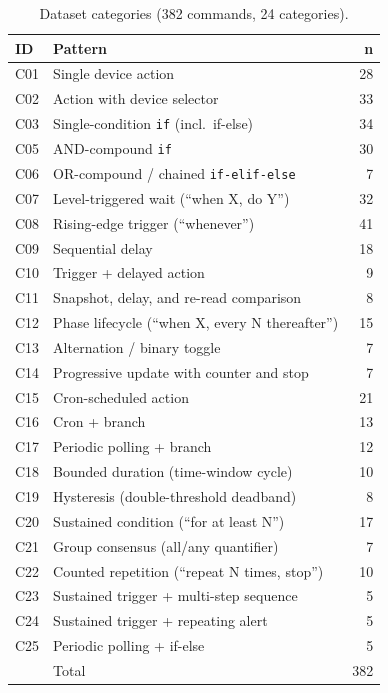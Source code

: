 \documentclass[sigconf,nonacm,anonymous,review]{acmart}
\begin{document}
\begin{table}[h]
\centering
\caption{Dataset categories (382 commands, 24 categories).}
\label{tab:categories}
\small
\setlength{\tabcolsep}{4pt}
\begin{tabular}{llr}
\toprule
ID & Pattern & n \\
\midrule
C01 & Single device action & 28 \\
C02 & Action with device selector & 33 \\
C03 & Single-condition \texttt{if} (incl.\ if-else) & 34 \\
C05 & AND-compound \texttt{if} & 30 \\
C06 & OR-compound / chained \texttt{if-elif-else} & 7 \\
C07 & Level-triggered wait (``when X, do Y'') & 32 \\
C08 & Rising-edge trigger (``whenever'') & 41 \\
C09 & Sequential delay & 18 \\
C10 & Trigger + delayed action & 9 \\
C11 & Snapshot, delay, and re-read comparison & 8 \\
C12 & Phase lifecycle (``when X, every N thereafter'') & 15 \\
C13 & Alternation / binary toggle & 7 \\
C14 & Progressive update with counter and stop & 7 \\
C15 & Cron-scheduled action & 21 \\
C16 & Cron + branch & 13 \\
C17 & Periodic polling + branch & 12 \\
C18 & Bounded duration (time-window cycle) & 10 \\
C19 & Hysteresis (double-threshold deadband) & 8 \\
C20 & Sustained condition (``for at least N'') & 17 \\
C21 & Group consensus (all/any quantifier) & 7 \\
C22 & Counted repetition (``repeat N times, stop'') & 10 \\
C23 & Sustained trigger + multi-step sequence & 5 \\
C24 & Sustained trigger + repeating alert & 5 \\
C25 & Periodic polling + if-else & 5 \\
\midrule
 & Total & 382 \\
\bottomrule
\end{tabular}
\end{table}
\end{document}
